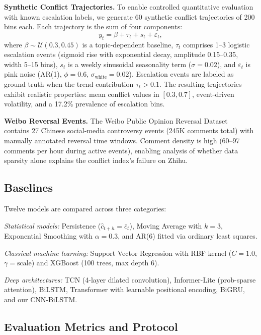 \documentclass[11pt,a4paper]{article}
\begin{document}
\textbf{Synthetic Conflict Trajectories.} To enable controlled quantitative evaluation with known escalation labels, we generate 60 synthetic conflict trajectories of 200 bins each. Each trajectory is the sum of four components:
\begin{equation}
y_t = \beta + \tau_t + s_t + \varepsilon_t,
\label{eq:synthetic}
\end{equation}
where $\beta \sim \mathcal{U}(0.3, 0.45)$ is a topic-dependent baseline, $\tau_t$ comprises 1--3 logistic escalation events (sigmoid rise with exponential decay, amplitude 0.15--0.35, width 5--15 bins), $s_t$ is a weekly sinusoidal seasonality term ($\sigma=0.02$), and $\varepsilon_t$ is pink noise (AR(1), $\phi=0.6$, $\sigma_{\text{white}}=0.02$). Escalation events are labeled as ground truth when the trend contribution $\tau_t > 0.1$. The resulting trajectories exhibit realistic properties: mean conflict values in $[0.3, 0.7]$, event-driven volatility, and a 17.2\% prevalence of escalation bins.

\textbf{Weibo Reversal Events.} The Weibo Public Opinion Reversal Dataset~\cite{Zhang2023Reversal} contains 27 Chinese social-media controversy events (245K comments total) with manually annotated reversal time windows. Comment density is high (60--97 comments per hour during active events), enabling analysis of whether data sparsity alone explains the conflict index's failure on Zhihu.

\subsection{Baselines}

Twelve models are compared across three categories:

\textit{Statistical models:} Persistence ($\hat{c}_{t+h} = \bar{c}_t$), Moving Average with $k{=}3$, Exponential Smoothing with $\alpha{=}0.3$, and AR(6) fitted via ordinary least squares.

\textit{Classical machine learning:} Support Vector Regression with RBF kernel ($C{=}1.0$, $\gamma{=}\text{scale}$) and XGBoost (100 trees, max depth 6).

\textit{Deep architectures:} TCN (4-layer dilated convolution), Informer-Lite (prob-sparse attention), BiLSTM, Transformer with learnable positional encoding, BiGRU, and our CNN-BiLSTM.

\subsection{Evaluation Metrics and Protocol}
\end{document}

